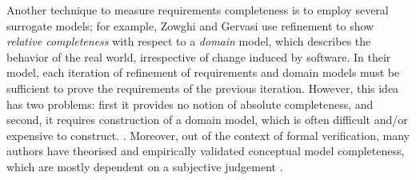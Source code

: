 Another technique to measure requirements completeness is to employ several surrogate models; for example, Zowghi and Gervasi use refinement to show {\em relative completeness} with respect to a {\em domain} model, which describes the behavior of the real world, irrespective of change induced by software.  In their model, each iteration of refinement of requirements and domain models must be sufficient to prove the requirements of the previous iteration.  However, this idea has two problems: first it provides no notion of absolute completeness, and second, it requires construction of a domain model, which is often difficult and/or expensive to construct. . Moreover, out of the context of formal verification, many authors have theorised and empirically validated conceptual model completeness, which are mostly dependent on a subjective judgement \cite{drechsler2012completeness, firesmith2005your, chang2007finding,katta2013investigating, zowghi2002three, espana2009evaluating}.

%

%


